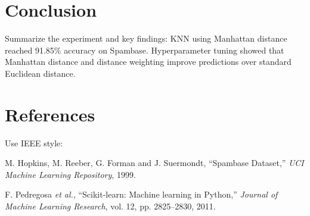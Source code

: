 \documentclass[12pt,a4paper]{article}
\begin{document}
\section{Conclusion}
Summarize the experiment and key findings:
KNN using Manhattan distance reached 91.85\% accuracy on Spambase. Hyperparameter tuning showed that Manhattan distance and distance weighting improve predictions over standard Euclidean distance.

\section{References}
Use IEEE style:
\begin{enumerate}[label={[\arabic*]}]
\item M. Hopkins, M. Reeber, G. Forman and J. Suermondt, ``Spambase Dataset,'' \textit{UCI Machine Learning Repository}, 1999.
\item F. Pedregosa \textit{et al.}, ``Scikit-learn: Machine learning in Python,'' \textit{Journal of Machine Learning Research}, vol. 12, pp. 2825--2830, 2011.
\end{enumerate}
\end{document}
